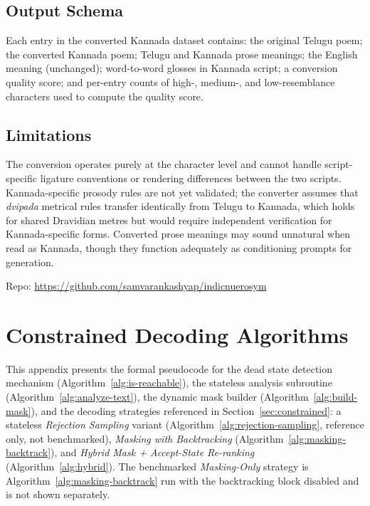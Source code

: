 \documentclass[11pt]{article}
\begin{document}
\subsection{Output Schema}

Each entry in the converted Kannada dataset contains: the original Telugu
poem; the converted Kannada poem; Telugu and Kannada prose meanings; the
English meaning (unchanged); word-to-word glosses in Kannada script; a
conversion quality score; and per-entry counts of high-, medium-, and
low-resemblance characters used to compute the quality score.

\subsection{Limitations}

The conversion operates purely at the character level and cannot handle
script-specific ligature conventions or rendering differences between the two
scripts. Kannada-specific prosody rules are not yet validated; the converter
assumes that \textit{dvipada} metrical rules transfer identically from Telugu
to Kannada, which holds for shared Dravidian metres but would require
independent verification for Kannada-specific forms. Converted prose meanings
may sound unnatural when read as Kannada, though they function adequately as
conditioning prompts for generation.


Repo: \url{https://github.com/samvarankashyap/indicnuerosym}

\section{Constrained Decoding Algorithms}
\label{app:algorithms}

This appendix presents the formal pseudocode for the dead state
detection mechanism (Algorithm~\ref{alg:is-reachable}), the stateless
analysis subroutine (Algorithm~\ref{alg:analyze-text}), the dynamic
mask builder (Algorithm~\ref{alg:build-mask}), and the decoding
strategies referenced in Section~\ref{sec:constrained}: a stateless
\emph{Rejection Sampling} variant (Algorithm~\ref{alg:rejection-sampling},
reference only, not benchmarked), \emph{Masking with Backtracking}
(Algorithm~\ref{alg:masking-backtrack}), and \emph{Hybrid Mask +
Accept-State Re-ranking} (Algorithm~\ref{alg:hybrid}). The benchmarked
\emph{Masking-Only} strategy is Algorithm~\ref{alg:masking-backtrack}
run with the backtracking block disabled and is not shown separately.
\end{document}

